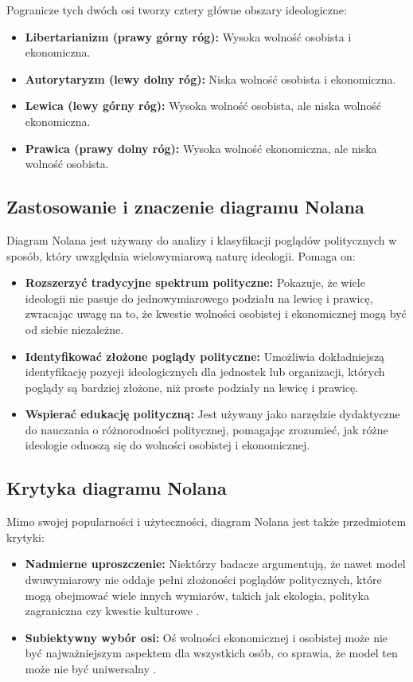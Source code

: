 Pogranicze tych dwóch osi tworzy cztery główne obszary ideologiczne:
\begin{itemize}
      \item \textbf{Libertarianizm (prawy górny róg):} Wysoka wolność osobista i ekonomiczna.
      \item \textbf{Autorytaryzm (lewy dolny róg):} Niska wolność osobista i ekonomiczna.
      \item \textbf{Lewica (lewy górny róg):} Wysoka wolność osobista, ale niska wolność ekonomiczna.
      \item \textbf{Prawica (prawy dolny róg):} Wysoka wolność ekonomiczna, ale niska wolność osobista.
\end{itemize}

\subsection{Zastosowanie i znaczenie diagramu Nolana}
Diagram Nolana jest używany do analizy i klasyfikacji poglądów politycznych w sposób, który uwzględnia wielowymiarową naturę ideologii. Pomaga on:

\begin{itemize}
      \item \textbf{Rozszerzyć tradycyjne spektrum polityczne:} Pokazuje, że wiele ideologii nie pasuje do jednowymiarowego podziału na lewicę i prawicę,
            zwracając uwagę na to, że kwestie wolności osobistej i ekonomicznej mogą być od siebie niezależne.
      \item \textbf{Identyfikować złożone poglądy polityczne:} Umożliwia dokładniejszą \\ identyfikację pozycji ideologicznych dla jednostek lub organizacji,
            których poglądy są bardziej złożone, niż proste podziały na lewicę i prawicę.
      \item \textbf{Wspierać edukację polityczną:} Jest używany jako narzędzie dydaktyczne do nauczania o różnorodności politycznej, pomagając zrozumieć,
            jak różne ideologie odnoszą się do wolności osobistej i ekonomicznej.
\end{itemize}

\subsection{Krytyka diagramu Nolana}
Mimo swojej popularności i użyteczności, diagram Nolana jest także przedmiotem krytyki:
\begin{itemize}
      \item \textbf{Nadmierne uproszczenie:} Niektórzy badacze argumentują, że nawet model dwuwymiarowy nie oddaje pełni złożoności poglądów politycznych,
            które mogą obejmować wiele innych wymiarów, takich jak ekologia, polityka zagraniczna czy kwestie kulturowe \cite{Rothbard1978}.
      \item \textbf{Subiektywny wybór osi:} Oś wolności ekonomicznej i osobistej może nie być najważniejszym aspektem dla wszystkich osób, co sprawia, że model ten może nie być uniwersalny \cite{Kirsch2020}.
\end{itemize}
